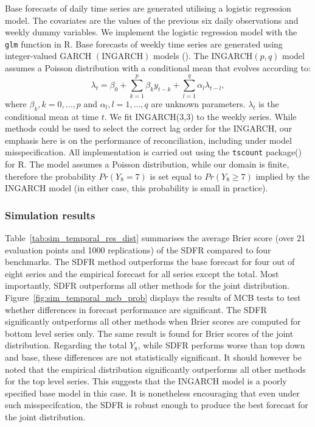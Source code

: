\documentclass[a4paper,review,12pt,authoryear]{elsarticle}
\let\code=\texttt
\let\proglang=\textsf
\theoremstyle{definition}
\begin{document}
     Base forecasts of daily time series are generated utilising a logistic regression model. The covariates are the values of the previous six daily observations and weekly dummy variables. We implement the logistic regression model with the \code{glm} function in \proglang{R}. Base forecasts of weekly time series are generated using integer-valued GARCH $(\textrm{INGARCH})$ models (). The $\textrm{INGARCH}(p, q)$ model assumes a Poisson distribution with a conditional mean that evolves according to:
     \[
      \lambda_t = \beta_0 + \sum_{k=1}^p \beta_ky_{t-k} + \sum_{l=1}^q \alpha_l\lambda_{t-l}, 
     \] where $\beta_k, k=0,\dots,p$ and $\alpha_l, l=1,\dots,q$ are unknown parameters. $\lambda_t$ is the conditional mean at time $t$.  We fit INGARCH(3,3) to the weekly series. While methods could be used to select the correct lag order for the INGARCH, our emphasis here is on the performance of reconciliation, including under model misspecification. All implementation is carried out using the \code{tscount} package() for \proglang{R}. The model assumes a Poisson distribution, while our domain is finite, therefore the probability $Pr(Y_8=7)$ is set equal to $Pr(Y_8\geq 7)$ implied by the INGARCH model (in either case, this probability is small in practice).


     \subsubsection{Simulation results}
     Table~\ref{tab:sim_temporal_res_dist} summarises the average Brier score (over 21 evaluation points and 1000 replications) of the SDFR compared to four benchmarks.
     The SDFR method outperforms the base forecast for four out of eight series and the empirical forecast for all series except the total. Most importantly, SDFR outperforms all other methods for the joint distribution.      Figure~\ref{fig:sim_temporal_mcb_prob} displays the results of MCB tests to test whether differences in forecast performance are significant. The SDFR significantly outperforms all other methods when Brier scores are computed for bottom level series only. The same result is found for Brier scores of the joint distribution. Regarding the total $Y_8$, while SDFR performs worse than top down and base, these differences are not statistically significant. It should however be noted that the empirical distribution significantly outperforms all other methods for the top level series. This suggests that the INGARCH model is a poorly specified base model in this case. It is nonetheless encouraging that even under such misspecifcation, the SDFR is robust enough to produce the best forecast for the joint distribution.
     
\end{document}
